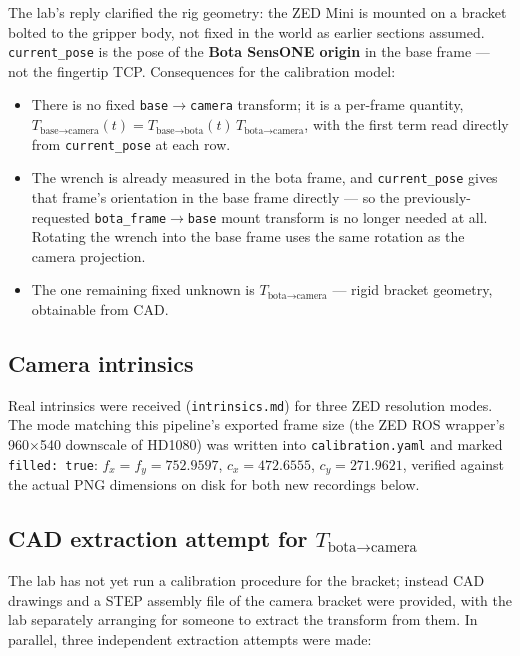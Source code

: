 \documentclass[11pt]{article}
\begin{document}
The lab's reply clarified the rig geometry: the ZED Mini is mounted on a
bracket bolted to the gripper body, not fixed in the world as earlier
sections assumed. \texttt{current\_pose} is the pose of the \textbf{Bota
SensONE origin} in the base frame --- not the fingertip TCP. Consequences
for the calibration model:
\begin{itemize}[noitemsep]
  \item There is no fixed \texttt{base}$\to$\texttt{camera} transform; it is
        a per-frame quantity, $T_{\text{base}\to\text{camera}}(t) =
        T_{\text{base}\to\text{bota}}(t)\,T_{\text{bota}\to\text{camera}}$,
        with the first term read directly from \texttt{current\_pose} at
        each row.
  \item The wrench is already measured in the bota frame, and
        \texttt{current\_pose} gives that frame's orientation in the base
        frame directly --- so the previously-requested
        \texttt{bota\_frame}$\to$\texttt{base} mount transform is no longer
        needed at all. Rotating the wrench into the base frame uses the same
        rotation as the camera projection.
  \item The one remaining fixed unknown is $T_{\text{bota}\to\text{camera}}$
        --- rigid bracket geometry, obtainable from CAD.
\end{itemize}

\subsection{Camera intrinsics}

Real intrinsics were received (\texttt{intrinsics.md}) for three ZED
resolution modes. The mode matching this pipeline's exported frame size
(the ZED ROS wrapper's 960$\times$540 downscale of HD1080) was written into
\texttt{calibration.yaml} and marked \texttt{filled: true}:
$f_x=f_y=752.9597$, $c_x=472.6555$, $c_y=271.9621$, verified against the
actual PNG dimensions on disk for both new recordings below.

\subsection{CAD extraction attempt for $T_{\text{bota}\to\text{camera}}$}

The lab has not yet run a calibration procedure for the bracket; instead
CAD drawings and a STEP assembly file of the camera bracket were provided,
with the lab separately arranging for someone to extract the transform
from them. In parallel, three independent extraction attempts were made:
\end{document}
